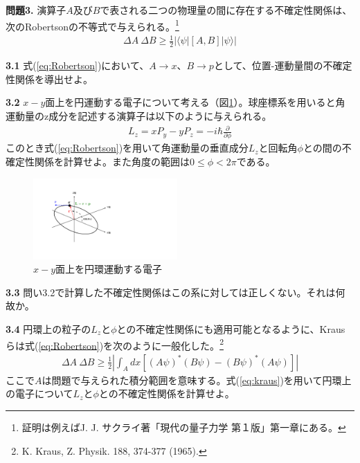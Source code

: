 \documentclass[11pt,pra,aps]{revtex4}
\begin{document}
\noindent
{\bf 問題3.}
演算子$A$及び$B$で表される二つの物理量の間に存在する不確定性関係は、次のRobertsonの不等式で与えられる。\footnote{証明は例えばJ. J. サクライ著「現代の量子力学 第１版」第一章にある。}
\begin{align}
  \Delta A\ \Delta B \geq \frac{1}{2}|\langle\psi|[A,B]|\psi\rangle|\label{eq:Robertson}
\end{align}

\noindent
{\bf 3.1} 式(\ref{eq:Robertson})において、$A\rightarrow x$、$B\rightarrow p$として、位置-運動量間の不確定性関係を導出せよ。

\noindent
{\bf 3.2} $x-y$面上を円運動する電子について考える（図\ref{fig:circ}）。球座標系を用いると角運動量のz成分を記述する演算子は以下のように与えられる。
\begin{align}
  L_z=xP_y-yP_z=-i\hbar\frac{\partial}{\partial \phi}
\end{align}
このとき式(\ref{eq:Robertson})を用いて角運動量の垂直成分$L_z$と回転角$\phi$との間の不確定性関係を計算せよ。また角度の範囲は$0\leq \phi < 2\pi$である。

\begin{figure}
  \centering
  \includegraphics[width=5.5cm]{circular-motion.pdf}
  \caption{\label{fig:circ} $x-y$面上を円環運動する電子}
\end{figure}

\noindent
{\bf 3.3} 問い3.2で計算した不確定性関係はこの系に対しては正しくない。それは何故か。

\noindent
{\bf 3.4} 円環上の粒子の$L_z$と$\phi$との不確定性関係にも適用可能となるように、Krausらは式(\ref{eq:Robertson})を次のように一般化した。\footnote{K. Kraus, Z. Physik. 188, 374-377 (1965).}
\begin{align}
  \Delta A\ \Delta B \geq \frac{1}{2}\left|\int_A dx \left[(A\psi)^{*} (B\psi) - (B\psi)^{*} (A\psi)\right]\right|\label{eq:kraus}
\end{align}
ここで$A$は問題で与えられた積分範囲を意味する。式(\ref{eq:kraus})を用いて円環上の電子について$L_z$と$\phi$との不確定性関係を計算せよ。
\end{document}
